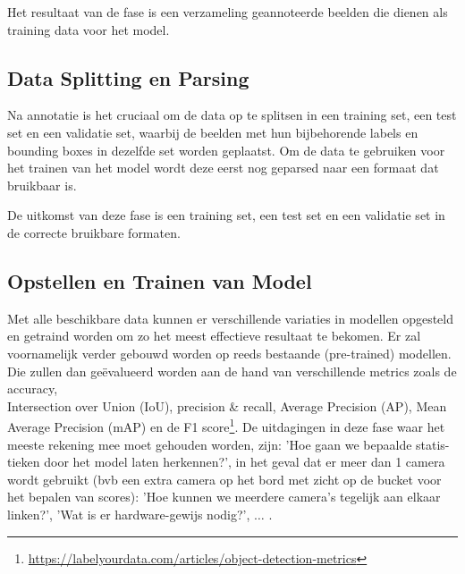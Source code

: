 Het resultaat van de fase is een verzameling geannoteerde beelden die dienen als training data voor het model.


\subsection{Data Splitting en Parsing}
Na annotatie is het cruciaal om de data op te splitsen in een training set, een test set en een validatie set, waarbij de beelden met hun bijbehorende labels en bounding boxes in dezelfde set worden geplaatst. Om de data te gebruiken voor het trainen van het model wordt deze eerst nog geparsed naar een formaat dat bruikbaar is. 

De uitkomst van deze fase is een training set, een test set en een validatie set in de correcte bruikbare formaten.



\subsection{Opstellen en Trainen van Model}
Met alle beschikbare data kunnen er verschillende variaties in modellen opgesteld en getraind worden om zo het meest effectieve resultaat te bekomen. Er zal voornamelijk verder gebouwd worden op reeds bestaande (pre-trained) modellen. Die zullen dan geëvalueerd worden aan de hand van verschillende metrics zoals de accuracy, \\Intersection over Union (IoU), precision \& recall, Average Precision (AP), Mean Average Precision (mAP) en de F1 score\footnote{\url{https://labelyourdata.com/articles/object-detection-metrics}}. De uitdagingen in deze fase waar het meeste rekening mee moet gehouden worden, zijn: 'Hoe gaan we bepaalde statis-\\tieken door het model laten herkennen?', in het geval dat er meer dan 1 camera wordt gebruikt (bvb een extra camera op het bord met zicht op de bucket voor het bepalen van scores): 'Hoe kunnen we meerdere camera's tegelijk aan elkaar \\linken?', 'Wat is er hardware-gewijs nodig?', $\ldots$ .

